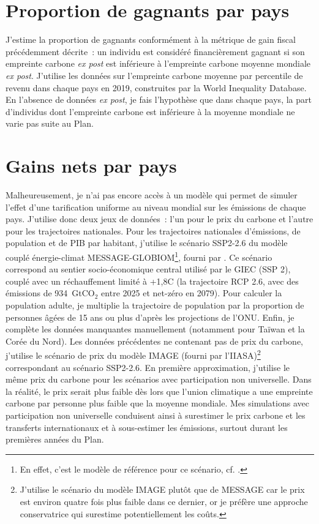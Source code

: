 \documentclass[a5paper,french,openany]{memoir}
\begin{document}
\section{Proportion de gagnants par pays}

J'estime la proportion de gagnants conformément à la métrique de gain fiscal précédemment décrite~: un individu est considéré financièrement gagnant si son empreinte carbone \textit{ex post} est inférieure à l'empreinte carbone moyenne mondiale \textit{ex post}. J'utilise les données sur l'empreinte carbone moyenne par percentile de revenu dans chaque pays en 2019, construites par la World Inequality Database. En l'absence de données \textit{ex post}, je fais l'hypothèse que dans chaque pays, la part d'individus dont l'empreinte carbone est inférieure à la moyenne mondiale ne varie pas suite au Plan.

\section{Gains nets par pays}\label{app:pays} 

Malheureusement, je n'ai pas encore accès à un modèle qui permet de simuler l'effet d'une tarification uniforme au niveau mondial sur les émissions de chaque pays. J'utilise donc deux jeux de données~: l'un pour le prix du carbone et l'autre pour les trajectoires nationales. Pour les trajectoires nationales d'émissions, de population et de PIB par habitant, j'utilise le scénario SSP2-2.6 du modèle couplé énergie-climat MESSAGE-GLOBIOM\footnote{En effet, c'est le modèle de référence pour ce scénario, cf. \cite{fricko_marker_2017}.}, fourni par \cite{gutschow_country-resolved_2021}. Ce scénario correspond au sentier socio-économique central utilisé par le GIEC (SSP 2), couplé avec un réchauffement limité à +1,8\textdegree{}C (la trajectoire RCP 2.6, avec des émissions de 934~GtCO$_\text{2}$ entre 2025 et net-zéro en 2079). Pour calculer la population adulte, je multiplie la trajectoire de population par la proportion de personnes âgées de 15 ans ou plus d'après les projections de l'ONU. Enfin, je complète les données manquantes manuellement (notamment pour Taïwan et la Corée du Nord). Les données précédentes ne contenant pas de prix du carbone, j'utilise le scénario de prix du modèle IMAGE (fourni par l'IIASA)\footnote{J'utilise le scénario du modèle IMAGE plutôt que de MESSAGE car le prix est environ quatre fois plus faible dans ce dernier, or je préfère une approche conservatrice qui surestime potentiellement les coûts. 
} correspondant au scénario SSP2-2.6. En première approximation, j'utilise le même prix du carbone pour les scénarios avec participation non universelle. Dans la réalité, le prix serait plus faible dès lors que l'union climatique a une empreinte carbone par personne plus faible que la moyenne mondiale. Mes simulations avec participation non universelle conduisent ainsi à surestimer le prix carbone et les transferts internationaux et à sous-estimer les émissions, surtout durant les premières années du Plan.
\end{document}
